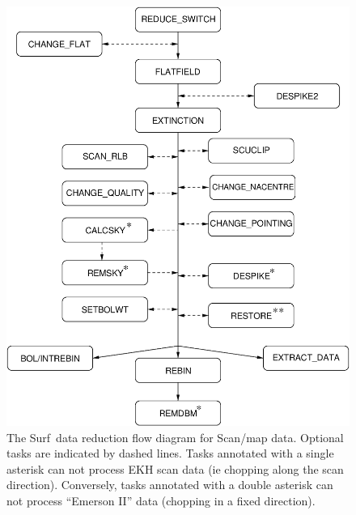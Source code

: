 \documentclass[twoside,11pt]{article}
\newcommand{\scusoft}          {{\sc Surf}}
\newcommand{\htmlimage}[1]{}
\renewcommand{\_}{\texttt{\symbol{95}}}
\begin{document}
\begin{figure}
\includegraphics[width=\textwidth]{sun216_flow_scan.eps}
\caption{The \scusoft\ data reduction flow diagram for Scan/map
data. Optional tasks are
indicated by dashed lines. Tasks annotated with a single asterisk 
can not process EKH scan data (ie chopping along the scan direction).
Conversely, tasks annotated with a double asterisk can not process
``Emerson II'' data (chopping in a fixed direction).
}
\label{flowpath_scan}
\end{figure}
\end{document}
